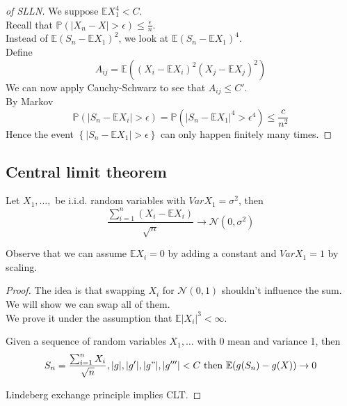 \documentclass[../main.tex]{subfiles}
\begin{document}
\begin{proof}[of SLLN]
	We suppose $ \mathbb{E} X_1^{4}< C$.\\
Recall that $ \mathbb{P}( |X_n- X| > \epsilon) \leq \frac{\epsilon }{n}$.\\
Instead of $ \mathbb{E}( S_n- \mathbb{E}X_1)^{2} $, we look at 
$ \mathbb{E}( S_n- \mathbb{E}X_1)^{4}$.\\
Define
\[ 
A_{ij}  = \mathbb{E}( ( X_i - \mathbb{E}X_i)^{2} ( X_j - \mathbb{E}X_j)^{2}) 
\]
We can now apply Cauchy-Schwarz to see that $A_{ij} \leq  C'$.\\
By Markov 
\[ 
\mathbb{P}( |S_n- \mathbb{E}X_i| > \epsilon) = \mathbb{P}( |S_n - \mathbb{E}X_1|^{4}> \epsilon^{4}) \leq \frac{c}{n^{2}}
\]
Hence the event $ \left\{ |S_n- \mathbb{E}X_1| > \epsilon \right\} $ can only happen finitely many times.


\end{proof}
\subsection{Central limit theorem}
\begin{thm}
	Let $X_1,\ldots, $ be i.i.d. random variables with $ Var X_1= \sigma^{2}$, then
	\[ 
	\frac{ \sum_{i=1}^{ n}( X_i - \mathbb{E}X_i) }{ \sqrt{n} } \to \mathcal{N}( 0, \sigma^{2}) 
	\]
	
\end{thm}
Observe that we can assume $\mathbb{E}X_i = 0$ by adding a constant and $ Var X_1 =1$ by scaling.
\begin{proof}
The idea is that swapping $X_i$ for $ \mathcal{N}( 0,1) $ shouldn't influence the sum.\\
We will show we can swap all of them.\\
We prove it under the assumption that $ \mathbb{E}|X_i| ^{3}< \infty $.\\
\begin{propo}
Given a sequence of random variables $X_1, \ldots$ with 0 mean and variance 1, then
\[ 
S_n = \frac{ \sum_{i=1}^{ n}X_i}{ \sqrt{n} }, |g|,|g'|, |g"|, |g'''| < C \text{ then }    \mathbb{E}( g( S_n) - g( X) ) \to 0
\]

\end{propo}
Lindeberg exchange principle implies CLT.

\end{proof}

	
\end{document}
